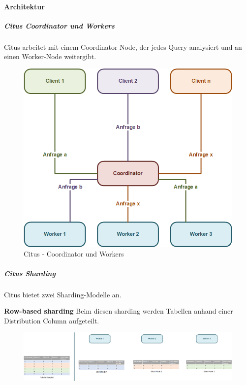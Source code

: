 \begin{flushleft}
    \paragraph{Architektur}
    \begin{flushleft}
        \subparagraph{Citus Coordinator und Workers}
        Citus arbeitet mit einem Coordinator-Node, der jedes Query analysiert und an einen Worker-Node weitergibt.
        \begin{figure}[H]
            \centering
            \includegraphics[width=0.75\linewidth]{source/implementation/evaluation/postgresql_ha_solutions/stackgres/citus_coordinator_worker}
            \caption{Citus - Coordinator und Workers}
            \label{fig:citus_coordinator_worker}
        \end{figure}
    \end{flushleft}
    \begin{flushleft}
        \subparagraph{Citus Sharding}
        Citus bietet zwei Sharding-Modelle an.
        \begin{flushleft}
            \textbf{Row-based sharding}
            Beim diesen sharding werden Tabellen anhand einer Distribution Column aufgeteilt. \cite{2Y5FA36C, FDUUL9IM}
            \begin{figure}[H]
                \centering
                \includegraphics[width=0.8\linewidth]{source/implementation/evaluation/postgresql_ha_solutions/stackgres/citus_row-based-sharding}

\end{figure}
\end{flushleft}
\end{flushleft}
\end{flushleft}
